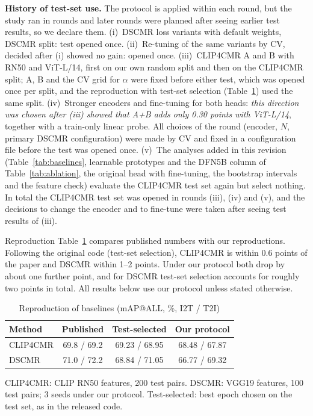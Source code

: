 \documentclass[conference]{IEEEtran}
\makeatletter
\def\subsection{\@startsection{subsection}{2}{\z@}{1.6ex plus .8ex minus .4ex}{.7ex plus .2ex}%
  {\normalfont\fontsize{11}{13}\selectfont\bfseries\itshape\raggedright}}
\makeatother
\begin{document}
\textbf{History of test-set use.} The protocol is applied within each round, but the study ran in rounds and later rounds were planned after seeing earlier test results, so we declare them. (i)~DSCMR loss variants with default weights, DSCMR split: test opened once. (ii)~Re-tuning of the same variants by CV, decided after (i) showed no gain: opened once. (iii)~CLIP4CMR A and B with RN50 and ViT-L/14, first on our own random split and then on the CLIP4CMR split; A, B and the CV grid for $\alpha$ were fixed before either test, which was opened once per split, and the reproduction with test-set selection (Table~\ref{tab:repro}) used the same split. (iv)~Stronger encoders and fine-tuning for both heads: \emph{this direction was chosen after (iii) showed that A+B adds only 0.30 points with ViT-L/14}, together with a train-only linear probe. All choices of the round (encoder, $N$, primary DSCMR configuration) were made by CV and fixed in a configuration file before the test was opened once. (v)~The analyses added in this revision (Table~\ref{tab:baselines}, learnable prototypes and the DFN5B column of Table~\ref{tab:ablation}, the original head with fine-tuning, the bootstrap intervals and the feature check) evaluate the CLIP4CMR test set again but select nothing. In total the CLIP4CMR test set was opened in rounds (iii), (iv) and (v), and the decisions to change the encoder and to fine-tune were taken after seeing test results of (iii).

\subsection{Reproduction}
Table~\ref{tab:repro} compares published numbers with our reproductions. Following the original code (test-set selection), CLIP4CMR is within 0.6 points of the paper and DSCMR within 1--2 points. Under our protocol both drop by about one further point, and for DSCMR test-set selection accounts for roughly two points in total. All results below use our protocol unless stated otherwise.

\begin{table}[t]
\centering
\caption{Reproduction of baselines (mAP@ALL, \%, I2T / T2I)}
\label{tab:repro}
\small
\setlength{\tabcolsep}{5pt}
\begin{tabular*}{\columnwidth}{@{\extracolsep{\fill}}lccc@{}}
\toprule
Method & Published & Test-selected & Our protocol \\
\midrule
CLIP4CMR & 69.8 / 69.2 & 69.23 / 68.95 & 68.48 / 67.87 \\
DSCMR & 71.0 / 72.2 & 68.84 / 71.05 & 66.77 / 69.32 \\
\bottomrule
\end{tabular*}

\vspace{2pt}
\parbox{\columnwidth}{\footnotesize CLIP4CMR: CLIP RN50 features, 200 test pairs. DSCMR: VGG19 features, 100 test pairs; 3 seeds under our protocol. Test-selected: best epoch chosen on the test set, as in the released code.}
\end{table}
\end{document}

